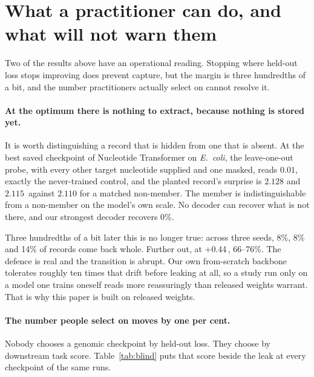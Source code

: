 \section{What a practitioner can do, and what will not warn them}
\label{sec:blind}

Two of the results above have an operational reading. Stopping where held-out loss stops improving
does prevent capture, but the margin is three hundredths of a bit, and the number practitioners
actually select on cannot resolve it.

\paragraph{At the optimum there is nothing to extract, because nothing is stored yet.}
It is worth distinguishing a record that is hidden from one that is absent. At the best saved
checkpoint of Nucleotide Transformer on \emph{E.~coli}, the leave-one-out probe, with every other
target nucleotide supplied and one masked, reads $0.01$, exactly the never-trained control, and the
planted
record's surprise is $2.128$ and $2.115$\,\bits{} against $2.110$ for a matched non-member. The
member is indistinguishable from a non-member on the model's own scale. No decoder can recover what
is not there, and our strongest decoder recovers 0\%.

Three hundredths of a bit later this is no longer true: across three seeds, 8\%, 8\% and 14\% of
records come back whole. Further out, at +0.44\,\bits, 66--76\%. The defence is real and the
transition is abrupt. Our own from-scratch backbone tolerates roughly ten times that drift before
leaking at all, so a study run only on a model one trains oneself reads more reassuringly than
released weights warrant. That is why this paper is built on released weights.

\paragraph{The number people select on moves by one per cent.}
Nobody chooses a genomic checkpoint by held-out loss. They choose by downstream task score.
Table~\ref{tab:blind} puts that score beside the leak at every checkpoint of the same runs.

